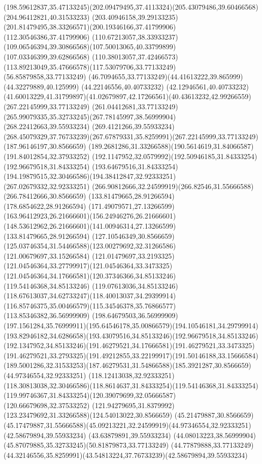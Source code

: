 {{\curveto(198.59612837,35.47133245)(202.09479495,37.4113324)(205.43079486,39.60466568)
\lineto(204.96412821,40.31533233)
\curveto(203.40946158,39.29133235)(201.81479495,38.33266571)(200.19346166,37.41799906)
\lineto(112.30546386,37.41799906)
\curveto(110.67213057,38.33933237)(109.06546394,39.30866568)(107.50013065,40.33799899)
\lineto(107.03346399,39.62866568)
\curveto(110.38013057,37.42466573)(113.89213049,35.47666578)(117.53079706,33.77133249)
\lineto(56.85879858,33.77133249)
\curveto(46.7094655,33.77133249)(44.41613222,39.865999)(44.32279889,40.125999)
\lineto(44.22146556,40.40733232)
\lineto(42.12946561,40.40733232)
\curveto(41.60013229,41.31799897)(41.02679897,42.17266561)(40.43613232,42.99266559)
\closepath
\moveto(267.22145999,33.77133249)
\lineto(261.04412681,33.77133249)
\curveto(265.99079335,35.32733245)(267.78145997,38.56999904)(268.22412663,39.55933234)
\lineto(269.4121266,39.55933234)
\curveto(268.45079329,37.76733239)(267.67879331,35.8259991)(267.22145999,33.77133249)
\moveto(187.96146197,30.8566659)
\curveto(189.2681286,31.33266588)(190.5614619,31.84066587)(191.84012854,32.37933252)
\curveto(192.1147952,32.0579992)(192.50946185,31.84333254)(192.96679518,31.84333254)
\curveto(193.64679516,31.84333254)(194.19879515,32.30466586)(194.38412847,32.92333251)
\lineto(267.02679332,32.92333251)
\curveto(266.90812666,32.24599919)(266.82546,31.55666588)(266.78412666,30.8566659)
\closepath
\moveto(133.81479665,28.91266594)
\lineto(178.6854622,28.91266594)
\curveto(171.49079571,27.13266599)(163.96412923,26.21666601)(156.24946276,26.21666601)
\curveto(148.53612962,26.21666601)(141.00946314,27.13266599)(133.81479665,28.91266594)
\moveto(127.10546349,30.8566659)
\curveto(125.03746354,31.54466588)(123.00279692,32.31266586)(121.00679697,33.15266584)
\curveto(121.01479697,33.2193325)(121.04546364,33.27799917)(121.04546364,33.3473325)
\curveto(121.04546364,34.17666581)(120.37346366,34.85133246)(119.54146368,34.85133246)
\curveto(119.07613036,34.85133246)(118.67613037,34.62733247)(118.40013037,34.29399914)
\curveto(116.85746375,35.00466579)(115.34546378,35.76866577)(113.85346382,36.56999909)
\lineto(198.64679503,36.56999909)
\curveto(197.1561284,35.76999911)(195.64546178,35.00866579)(194.10546181,34.29799914)
\curveto(193.82946182,34.6286658)(193.43079516,34.85133246)(192.96679518,34.85133246)
\curveto(192.1347952,34.85133246)(191.46279521,34.17666581)(191.46279521,33.3473325)
\curveto(191.46279521,33.2793325)(191.49212855,33.22199917)(191.50146188,33.15666584)
\curveto(189.5001286,32.31533253)(187.46279531,31.54866588)(185.3921287,30.8566659)
\closepath
\moveto(44.97346554,32.92333251)
\lineto(118.12413038,32.92333251)
\curveto(118.30813038,32.30466586)(118.8614637,31.84333254)(119.54146368,31.84333254)
\curveto(119.99746367,31.84333254)(120.39079699,32.05666587)(120.66679698,32.37533252)
\curveto(121.94279695,31.8379992)(123.23479692,31.33266588)(124.54013022,30.8566659)
\lineto(45.21479887,30.8566659)
\curveto(45.17479887,31.55666588)(45.09213221,32.24599919)(44.97346554,32.92333251)
\moveto(42.58679894,39.55933234)
\lineto(43.63879891,39.55933234)
\curveto(44.08013223,38.56999904)(45.87079885,35.32733245)(50.81879873,33.77133249)
\lineto(44.77879888,33.77133249)
\curveto(44.32146556,35.8259991)(43.54813224,37.76733239)(42.58679894,39.55933234)
}
}
